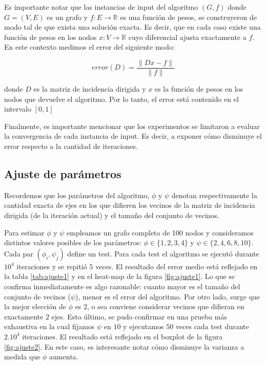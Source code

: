 \documentclass[conference,compsoc,a4paper]{IEEEtran}
\begin{document}
\smallskip

Es importante notar que las instancias de input del algoritmo $(G,f)$ 
donde $G=(V,E)$ es un grafo y $f: E \rightarrow \mathbb{R}$ es una 
función de pesos, se construyeron de modo tal de que exista una 
solución exacta. Es decir, que en cada caso existe una función de pesos 
en los nodos $x: V \rightarrow \mathbb{R}$ cuyo diferencial 
ajusta exactamente a $f$. En este contexto medimos el error 
del siguiente modo:

$$error(D) = \frac{\|Dx-f\|}{\|f\|}$$

\noindent donde $D$ es la matriz de incidencia dirigida y $x$ es la función de 
pesos en los nodos que devuelve el algoritmo. Por lo tanto, el error 
está contenido en el intervalo $[0,1]$

\smallskip

Finalmente, es importante mencionar que los experimentos se limitaron a 
evaluar la convergencia de cada instancia de input. Es decir, a exponer 
cómo disminuye el error respecto a la cantidad de iteraciones.

\subsection{Ajuste de parámetros}

Recordemos que los parámetros del algoritmo, $\phi$ y $\psi$ denotan 
respectivamente la cantidad exacta de ejes en los que difieren los 
vecinos de la matriz de incidencia dirigida (de la iteración actual) y 
el tamaño del conjunto de vecinos.

\smallskip

Para estimar $\phi$ y $\psi$ empleamos un grafo completo de 100 
nodos y consideramos distintos valores posibles de los parámetros: 
$\phi \in \{1,2,3,4\}$ y $\psi \in \{2,4,6,8,10\}$. Cada par 
$(\phi_i, \psi_j)$ define un test. Para cada test el algoritmo se 
ejecutó durante $10^4$ iteraciones y se repitió $5$ veces. El resultado 
del error medio está reflejado en la tabla \ref{tab:ajuste1} y en el 
heat-map de la figura \ref{fig:ajuste1}. Lo que se confirma 
inmediatamente es algo razonable: cuanto mayor es el tamaño del 
conjunto de vecinos ($\psi$), menor es el error del algoritmo. Por 
otro lado, surge que la mejor elección de $\phi$ es $2$, o sea 
conviene considerar vecinos que difieran en exactamente $2$ ejes. Esto 
último, se pudo confirmar en una prueba más exhaustiva en la cual 
fijamos $\psi$ en $10$ y ejecutamos $50$ veces cada test durante 
$2 . 10^4$ iteraciones. El resultado está reflejado en el boxplot de la 
figura \ref{fig:ajuste2}. En este caso, es interesante notar cómo 
disminuye la varianza a medida que $\phi$ aumenta.
\end{document}
